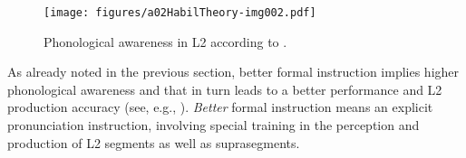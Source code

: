 \begin{figure}
\texttt{[image: figures/a02HabilTheory-img002.pdf]}
\caption{Phonological awareness in L2 according to \citet[106]{Kivistö-deSouza2015}.}
\label{fig:2.1}
\end{figure}

As already noted in the previous section, better formal instruction implies higher phonological awareness and that in turn leads to a better performance and L2 production accuracy (see, e.g., \citealt{MacKayEtAl2001, Piske2008, KennedyTrofimovich2010, Kivistö-deSouza2017}). \textit{Better} formal instruction means an explicit pronunciation instruction, involving special training in the perception and production of L2 segments as well as suprasegments.


